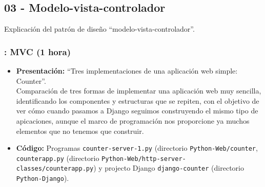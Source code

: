 \documentclass[a4paper,12pt]{article}
\begin{document}

\subsection{03 - Modelo-vista-controlador}

Explicación del patrón de diseño ``modelo-vista-controlador''.

\subsubsection{\martesI: MVC (1 hora)}
\label{cal:martesI}

\begin{itemize}
\item \textbf{Presentación:} ``Tres implementaciones de una aplicación web simple: Counter''. \\
  Comparación de tres formas de implementar una aplicación web muy sencilla, identificando los componentes y estructuras que se repiten, con el objetivo de ver cómo cuando pasamos a Django seguimos construyendo el mismo tipo de apicaciones, aunque el marco de programación nos proporcione ya muchos elementos que no tenemos que construir.
\item \textbf{Código:} Programas \verb|counter-server-1.py| (directorio \verb|Python-Web/counter|, \verb|counterapp.py| (directorio \verb|Python-Web/http-server-classes/counterapp.py|) y projecto Django \verb|django-counter| (directorio \verb|Python-Django|).
%

\end{itemize}
\end{document}
